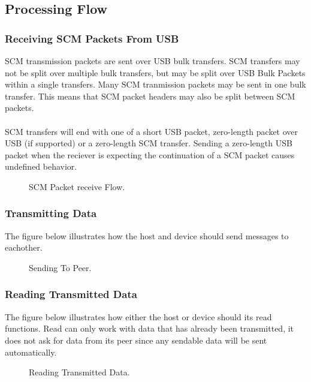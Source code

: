 \documentclass[10pt]{article}
\begin{document}
	\subsection{Processing Flow}
	\subsubsection{Receiving SCM Packets From USB}
	SCM transmission packets are sent over USB bulk transfers. SCM transfers may not be split over multiple bulk transfers, but may be split over USB Bulk Packets within a single transfers. Many SCM tranmission packets may be sent in one bulk transfer. This means that SCM packet headers may also be split between SCM packets. \\
	\\
	SCM transfers will end with one of a short USB packet, zero-length packet over USB (if supported) or a zero-length SCM transfer. Sending a zero-length USB packet when the reciever is expecting the continuation of a SCM packet causes undefined behavior. 
	\begin{figure}[H]
	\begin{center}
		\caption[SCM Packet receive Flow.]{SCM Packet receive Flow.}
		 \resizebox{\linewidth}{!}{}
	\end{center}
	\end{figure}

	\subsubsection{Transmitting Data}
	The figure below illustrates how the host and device should send messages to eachother. 
	\begin{figure}[H]
	\begin{center}
		\caption[Sending To Peer]{Sending To Peer.}
		\resizebox{\linewidth}{!}{}
	\end{center}
	\end{figure}


	\subsubsection{Reading Transmitted Data}
	The figure below illustrates how either the host or device should its read functions. Read can only work with data that has already been transmitted, it does not ask for data from its peer since any sendable data will be sent automatically. 
	\begin{figure}[H]
		\begin{center}
			\caption[Reading Transmitted Data.]{Reading Transmitted Data.}
			\resizebox{\linewidth}{!}{}
		\end{center}
	\end{figure}
\end{document}
